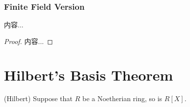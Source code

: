 \documentclass[Total.tex]{subfiles}
\begin{document}
	\subsubsection{Finite Field Version}
	
	\begin{theorem}
		内容...
	\end{theorem}
	\begin{proof}
		内容...
	\end{proof}
	\section{Hilbert's Basis Theorem}
	
	\begin{theorem}
		(Hilbert) Suppose that $R$ be a Noetherian ring, so is $R[X]$.
	\end{theorem}
	
\end{document}
